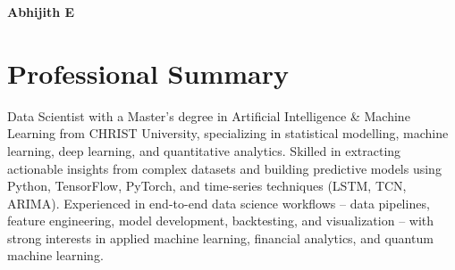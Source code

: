 \documentclass[a4paper,10.5pt]{article}
\begin{document}

\begin{center}

{\Huge\bfseries\color{textblack} Abhijith E}

\vspace{4pt}

\small
{}

\end{center}

\vspace{2pt}


\section{Professional Summary}

\small{
Data Scientist with a Master’s degree in Artificial Intelligence \& Machine Learning from CHRIST University, specializing in statistical modelling, machine learning, deep learning, and quantitative analytics. Skilled in extracting actionable insights from complex datasets and building predictive models using Python, TensorFlow, PyTorch, and time-series techniques (LSTM, TCN, ARIMA). Experienced in end-to-end data science workflows -- data pipelines, feature engineering, model development, backtesting, and visualization -- with strong interests in applied machine learning, financial analytics, and quantum machine learning.
}
\end{document}
